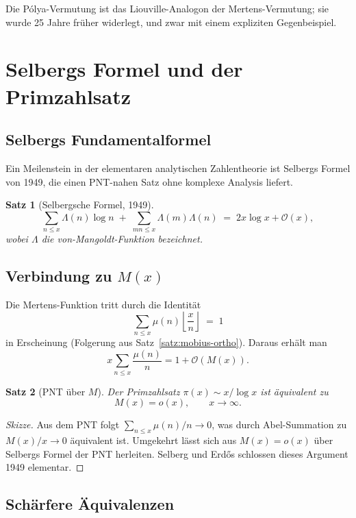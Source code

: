 \documentclass[12pt,a4paper]{amsart}
\newtheorem{theorem}{Satz}[section]
\theoremstyle{definition}
\newcommand{\BigO}{\mathcal{O}}
\begin{document}
Die Pólya-Vermutung ist das Liouville-Analogon der Mertens-Vermutung; sie
wurde 25 Jahre früher widerlegt, und zwar mit einem expliziten Gegenbeispiel.

\section{Selbergs Formel und der Primzahlsatz}
\label{sec:selberg}

\subsection{Selbergs Fundamentalformel}

Ein Meilenstein in der elementaren analytischen Zahlentheorie ist Selbergs
Formel von 1949, die einen PNT-nahen Satz ohne komplexe Analysis liefert.

\begin{theorem}[Selbergsche Formel, 1949]
\label{satz:selberg}
\[
  \sum_{n \le x} \Lambda(n)\log n
  \;+\; \sum_{mn \le x} \Lambda(m)\Lambda(n)
  \;=\; 2x\log x + \BigO(x),
\]
wobei $\Lambda$ die von-Mangoldt-Funktion bezeichnet.
\end{theorem}

\subsection{Verbindung zu $M(x)$}

Die Mertens-Funktion tritt durch die Identität
\[
  \sum_{n \le x} \mu(n)\left\lfloor\frac{x}{n}\right\rfloor \;=\; 1
\]
in Erscheinung (Folgerung aus Satz~\ref{satz:mobius-ortho}).  Daraus erhält
man
\[
  x\sum_{n \le x}\frac{\mu(n)}{n} = 1 + \BigO(M(x)).
\]

\begin{theorem}[PNT über $M$]
\label{satz:pnt-mertens}
Der Primzahlsatz $\pi(x) \sim x/\log x$ ist äquivalent zu
\[
  M(x) = o(x), \qquad x \to \infty.
\]
\end{theorem}

\begin{proof}[Skizze]
Aus dem PNT folgt $\sum_{n \le x}\mu(n)/n \to 0$, was durch Abel-Summation
zu $M(x)/x \to 0$ äquivalent ist.  Umgekehrt lässt sich aus $M(x)=o(x)$
über Selbergs Formel der PNT herleiten.  Selberg und Erd\H{o}s schlossen
dieses Argument 1949 elementar.
\end{proof}

\subsection{Schärfere Äquivalenzen}
\end{document}

